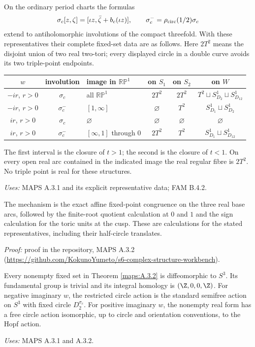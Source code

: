\begin{announcement}[MAPS A.3.2; A]\label{maps:A.3.2}
On the ordinary period charts the formulas
\[
 \sigma_c[z,\zeta]=[\iota z,\bar\zeta+b_c(\iota z)],
 \qquad \sigma_c^- =\rho_{\rm circ}(1/2)\sigma_c
 \label{maps:eq:A.3.3}
\]
extend to antiholomorphic involutions of the compact threefold.
With these representatives their complete fixed-set data are as follows.
Here $2T^2$ means the disjoint union of two real two-tori; every displayed
circle in a double curve avoids its two triple-point endpoints.
\begin{center}\small
\begin{tabular}{cclccc}
\toprule
$w$&involution&image in $\mathbb{RP}^1$&on $S_1$&on $S_2$&on $W$\\
\midrule
$-ir$, $r>0$&$\sigma_c$&all $\mathbb{RP}^1$&$2T^2$&$2T^2$&$T^2\sqcup S^1_{D_2}\sqcup S^1_{D_{12}}$\\
$-ir$, $r>0$&$\sigma_c^-$&$[1,\infty]$&$\varnothing$&$T^2$&$S^1_{D_1}\sqcup S^1_{D_2}$\\
$ir$, $r>0$&$\sigma_c$&$\varnothing$&$\varnothing$&$\varnothing$&$\varnothing$\\
$ir$, $r>0$&$\sigma_c^-$&$[\infty,1]$ through $0$&$2T^2$&$T^2$&$S^1_{D_1}\sqcup S^1_{D_{12}}$\\
\bottomrule
\end{tabular}
\end{center}
The first interval is the closure of $t>1$; the second is the closure
of $t<1$. On every open real arc contained in the indicated image the
real regular fibre is $2T^2$. No triple point is real for these structures.
\end{announcement}
\noindent\emph{Uses:} MAPS A.3.1 and its explicit representative data; FAM B.4.2.\par

The mechanism is the exact affine fixed-point congruence on the three real base arcs, followed by the finite-root quotient calculation at $0$ and $1$ and the sign calculation for the toric units at the cusp. These are calculations for the stated representatives, including their half-circle translates.

\noindent\emph{Proof:} proof in the repository, MAPS A.3.2 (\url{https://github.com/KokunoYumeto/s6-complex-structure-workbench}).

\begin{announcement}[MAPS A.3.3; A]\label{maps:A.3.3}
Every nonempty fixed set in Theorem \ref{maps:A.3.2} is diffeomorphic to $S^3$.
Its fundamental group is trivial and its integral homology is
$(\Z,0,0,\Z)$. For negative imaginary $w$, the restricted circle action
is the standard semifree action on $S^3$ with fixed circle
$D_2^{\sigma_c}$. For positive imaginary $w$, the nonempty real form
has a free circle action isomorphic, up to circle and orientation
conventions, to the Hopf action.
\end{announcement}
\noindent\emph{Uses:} MAPS A.3.1 and A.3.2.\par


